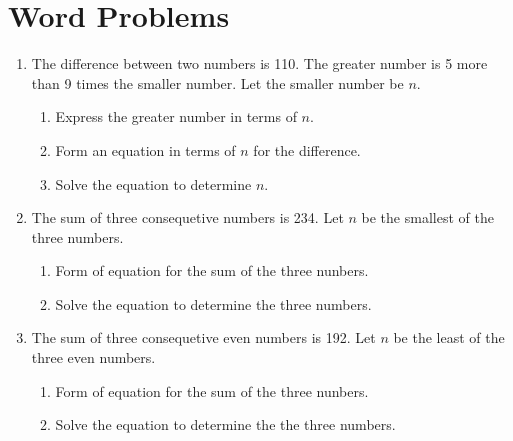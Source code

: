 \documentclass[12pt,letterpaper]{article}
\begin{document}
\section*{Word Problems}

\begin{large}
\begin{enumerate}
\item The difference between two numbers is 110. The greater number is 5 more than 9 times the smaller number. Let the smaller number be $n$.

\begin{enumerate}
	\item Express the greater number in terms of $n$.

	\addvspace{0.3in}

	\item Form an equation in terms of $n$ for the difference.

	\addvspace{0.3in}

	\item Solve the equation to determine $n$.

	\addvspace{0.6in}

\end{enumerate}

\item The sum of three consequetive numbers is 234.  Let $n$ be the smallest of the three numbers.


\begin{enumerate}
	\item Form of equation for the sum of the three nunbers.

	\addvspace{0.3in}

	\item Solve the equation to determine the three numbers.

	\addvspace{0.6in}

\end{enumerate}


\item The sum of three consequetive even numbers is 192.  Let $n$ be the least of the three even numbers.


\begin{enumerate}
	\item Form of equation for the sum of the three nunbers.

	\addvspace{0.3in}

	\item Solve the equation to determine the the three numbers.

	\addvspace{0.6in}

\end{enumerate}

\end{enumerate}
\end{large}
\end{document}
